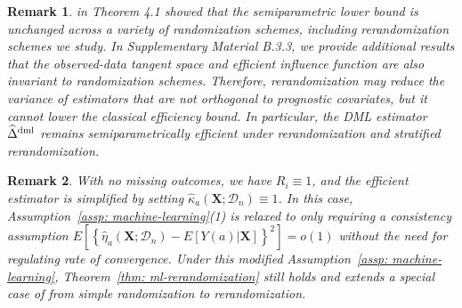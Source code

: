 \documentclass[12pt]{article}
\newtheorem{remark}{Remark}
\newcommand{\bX}{\boldsymbol{X}}\newcommand{\bO}{\boldsymbol{O}}
\begin{document}
{\begin{remark}\label{remark:bound}
{\cite{bai2023efficiency} in Theorem 4.1  showed that the semiparametric lower bound is unchanged across a variety of randomization schemes, including rerandomization schemes we study. In Supplementary Material B.3.3, we provide additional results that the observed-data tangent space and efficient influence function are also invariant to randomization schemes. Therefore, rerandomization may reduce the variance of estimators that are not orthogonal to prognostic covariates, but it cannot lower the classical efficiency bound. In particular, the DML estimator $\widehat{\Delta}^{\textup{dml}}$ remains semiparametrically efficient under rerandomization and stratified rerandomization.}
\end{remark}


\begin{remark}\label{rmk: ml}
    With no missing outcomes, we have $R_i \equiv1$, and the efficient estimator is simplified by setting $\widehat{\kappa}_a(\bX;\mathcal{D}_n) \equiv 1$. In this case, Assumption~\ref{assp: machine-learning}(1) is relaxed to only requiring a consistency assumption $E[\left\{\widehat{\eta}_a(\bX;\mathcal{D}_n)- E[Y(a)|\bX]\right\}^2] = o(1)$ without the need for regulating rate of convergence. Under this modified Assumption~\ref{assp: machine-learning}, Theorem~\ref{thm: ml-rerandomization} still holds and extends a special case of \cite{chernozhukov2018double} from simple randomization to rerandomization.
\end{remark}





}
\end{document}
